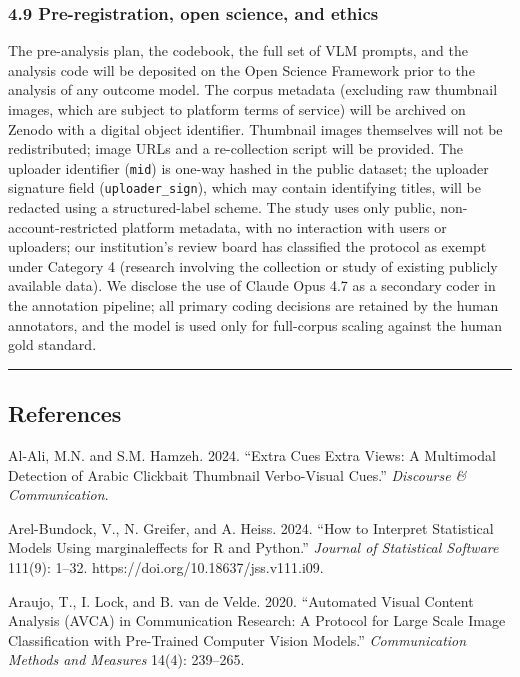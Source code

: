 \documentclass[
  12pt,
]{article}
\begin{document}
\subsubsection{4.9 Pre-registration, open science, and
ethics}\label{pre-registration-open-science-and-ethics}

The pre-analysis plan, the codebook, the full set of VLM prompts, and
the analysis code will be deposited on the Open Science Framework prior
to the analysis of any outcome model. The corpus metadata (excluding raw
thumbnail images, which are subject to platform terms of service) will
be archived on Zenodo with a digital object identifier. Thumbnail images
themselves will not be redistributed; image URLs and a re-collection
script will be provided. The uploader identifier (\texttt{mid}) is
one-way hashed in the public dataset; the uploader signature field
(\texttt{uploader\_sign}), which may contain identifying titles, will be
redacted using a structured-label scheme. The study uses only public,
non-account-restricted platform metadata, with no interaction with users
or uploaders; our institution's review board has classified the protocol
as exempt under Category 4 (research involving the collection or study
of existing publicly available data). We disclose the use of Claude Opus
4.7 as a secondary coder in the annotation pipeline; all primary coding
decisions are retained by the human annotators, and the model is used
only for full-corpus scaling against the human gold standard.

\begin{center}\rule{0.5\linewidth}{0.5pt}\end{center}

\subsection{References}\label{references}

Al-Ali, M.N. and S.M. Hamzeh. 2024. ``Extra Cues Extra Views: A
Multimodal Detection of Arabic Clickbait Thumbnail Verbo-Visual Cues.''
\emph{Discourse \& Communication}.

Arel-Bundock, V., N. Greifer, and A. Heiss. 2024. ``How to Interpret
Statistical Models Using marginaleffects for R and Python.''
\emph{Journal of Statistical Software} 111(9): 1--32.
https://doi.org/10.18637/jss.v111.i09.

Araujo, T., I. Lock, and B. van de Velde. 2020. ``Automated Visual
Content Analysis (AVCA) in Communication Research: A Protocol for Large
Scale Image Classification with Pre-Trained Computer Vision Models.''
\emph{Communication Methods and Measures} 14(4): 239--265.
\end{document}
